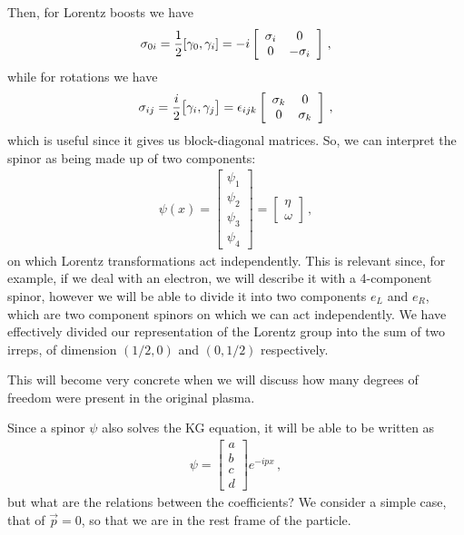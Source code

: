 \documentclass[main.tex]{subfiles}
\begin{document}
Then, for Lorentz boosts we have 
%
\begin{subequations}
\begin{align}
\sigma_{0i} = \frac{1}{2} \qty[\gamma_0, \gamma_{i}] = -i \left[\begin{array}{cc}
\sigma_{i} & 0 \\ 
0 & - \sigma_{i}
\end{array}\right]
\,,
\end{align}
\end{subequations}
%
while for rotations we have 
%
\begin{subequations}
\begin{align}
\sigma_{ij} = \frac{i}{2} \qty[\gamma_{i}, \gamma_{j}] = \epsilon_{ijk} \left[\begin{array}{cc}
\sigma_{k} & 0 \\ 
0 & \sigma_{k}
\end{array}\right]
\,,
\end{align}
\end{subequations}
%
which is useful since it gives us block-diagonal matrices. 
So, we can interpret the spinor as being made up of two components: 
%
\begin{subequations}
\begin{align}
\psi (x) = \left[\begin{array}{c}
\psi_1  \\ 
\psi_2  \\ 
\psi_3   \\ 
\psi_4 
\end{array}\right] 
= \left[\begin{array}{c}
\eta  \\ 
\omega 
\end{array}\right]
\,,
\end{align}
\end{subequations}
%
on which Lorentz transformations act independently. 
This is relevant since, for example, if we deal with an electron, we  will describe it with a 4-component spinor, however we will be able to divide it into two components \(e_L\) and \(e_R\), which are two component spinors on which we can act independently. 
We have effectively divided our representation of the Lorentz group into the sum of two irreps, of dimension \((1/2, 0)\) and \((0, 1/2)\) respectively. 

This will become very concrete when we will discuss how many degrees of freedom were present in the original plasma. 

Since a spinor \(\psi \) also solves the KG equation, it will be able to be written as 
%
\begin{subequations}
\begin{align}
\psi = \left[\begin{array}{c}
a \\ 
b \\ 
c \\ 
d
\end{array}\right] e^{-i px}
\,,
\end{align}
\end{subequations}
%
but what are the relations between the coefficients? 
We consider a simple case, that of \(\vec{p} =0\), so that we are in the rest frame of the particle. 
\end{document}
